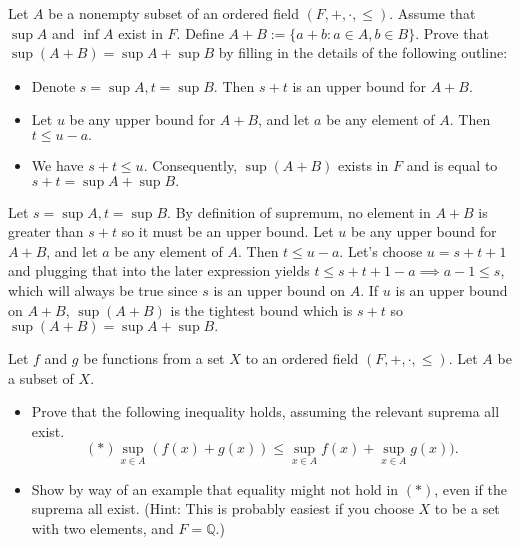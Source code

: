 \documentclass[12pt,letterpaper,boxed]{hmcpset}
\begin{document}
\begin{problem}[Exercise 2.4]
Let $A$ be a nonempty subset of an ordered field $(F,+,\cdot,\leq)$. Assume that $\sup A$ and $\inf A$ exist in $F.$ Define $A + B := \{ a + b : a \in A, b \in B \}.$ Prove that $\sup(A + B) = \sup A + \sup B$ by filling in the details of the following outline: 
\vspace{-2mm}
\begin{itemize}
	\itemsep0em
	\item Denote $s = \sup A, t = \sup B.$ Then $s + t$ is an upper bound for $A + B.$
	\item Let $u$ be any upper bound for $A + B$, and let $a$ be any element of $A$. Then $t \leq u - a.$
	\item We have $s+t \leq u.$ Consequently, $\sup(A + B)$ exists in $F$ and is equal to $s + t = \sup A + \sup B.$ 
\end{itemize}
\end{problem}

\begin{solution}
Let $s = \sup A, t = \sup B.$ By definition of supremum, no element in $A + B$ is greater than $s + t$ so it must be an upper bound.  Let $u$ be any upper bound for $A + B$, and let $a$ be any element of $A$. Then $t \leq u - a.$ Let's choose $u=s+t+1$ and plugging that into the later expression yields $t \leq s + t + 1 - a \implies a - 1 \leq s$, which will always be true since $s$ is an upper bound on $A$. If $u$ is an upper bound on $A+B$, $\sup(A+B)$ is the tightest bound which is $s + t$ so $\sup(A+B) = \sup A + \sup B.$ 
\end{solution}

\begin{problem}[Exercise 2.5.]
Let $f$ and $g$ be functions from a set $X$ to an ordered field $(F,+,\cdot,\leq).$ Let $A$ be a subset of $X.$
\begin{itemize}
	\itemsep0em
	\item Prove that the following inequality holds, assuming the relevant suprema all exist. $$(*) \sup_{x \in A}(f(x) + g(x)) \leq \sup_{x \in A}f(x) + \sup_{x\in A}g(x)).$$
	\item Show by way of an example that equality might not hold in $(*)$, even if the suprema all exist. (Hint: This is probably easiest if you choose $X$ to be a set with two elements, and $F=\mathbb{Q}$.)
\end{itemize}

\end{problem}
\end{document}
